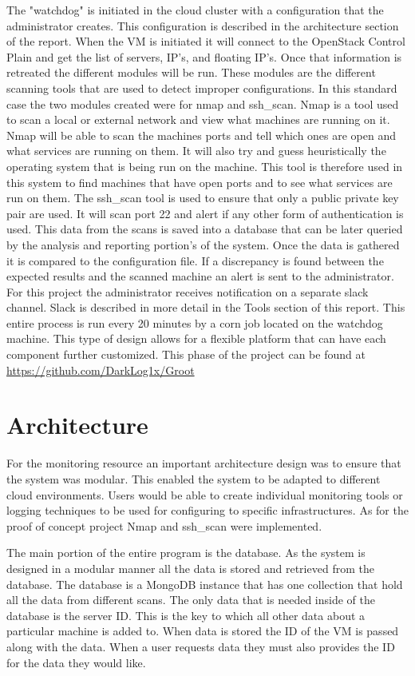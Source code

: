 \documentclass[12pt]{article}
\begin{document}
The "watchdog" is initiated in the cloud cluster with a configuration that the administrator creates. This configuration is described in the architecture section of the report. When the VM is initiated it will connect to the OpenStack Control Plain and get the list of servers, IP's, and floating IP's. Once that information is retreated the different modules will be run. These modules are the different scanning tools that are used to detect improper configurations. In this standard case the two modules created were for nmap and ssh\_scan. Nmap is a tool used to scan a local or external network and view what machines are running on it. Nmap will be able to scan the machines ports and tell which ones are open and what services are running on them. It will also try and guess heuristically the operating system that is being run on the machine. This tool is therefore used in this system to find machines that have open ports and to see what services are run on them. The ssh\_scan tool is used to ensure that only a public private key pair are used. It will scan port 22 and alert if any other form of authentication is used. This data from the scans is saved into a database that can be later queried by the analysis and reporting portion's of the system.
Once the data is gathered it is compared to the configuration file. If a discrepancy is found between the expected results and the scanned machine an alert is sent to the administrator. For this project the administrator receives notification on a separate slack channel. Slack is described in more detail in the Tools section of this report. This entire process is run every 20 minutes by a corn job located on the watchdog machine. This type of design allows for a flexible platform that can have each component further customized. This phase of the project can be found at \href{https://github.com/DarkLog1x/Groot}{https://github.com/DarkLog1x/Groot}

\section{Architecture}
For the monitoring resource an important architecture design was to ensure that the system was modular. This enabled the system to be adapted to different cloud environments. Users would be able to create individual monitoring tools or logging techniques to be used for configuring to specific infrastructures. As for the proof of concept project Nmap and ssh\_scan were implemented.

The main portion of the entire program is the database. As the system is designed in a modular manner all the data is stored and retrieved from the database. The database is a MongoDB \cite{mongodb} instance that has one collection that hold all the data from different scans. The only data that is needed inside of the database is the server ID\@. This is the key to which all other data about a particular machine is added to. When data is stored the ID of the VM is passed along with the data. When a user requests data they must also provides the ID for the data they would like.
\end{document}
